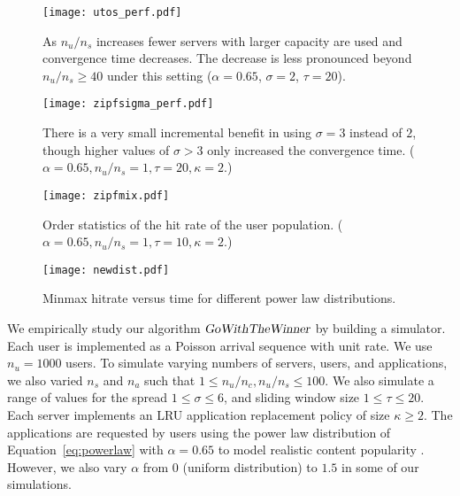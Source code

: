 \documentclass[conference]{IEEEtran}
\begin{document}
\begin{figure*}[t]
  \centering
\begin{minipage}[b]{0.45\textwidth}
\centering
\texttt{[image: utos\_perf.pdf]}
\caption{As $n_u/n_s$ increases  fewer servers with larger capacity are used and convergence time decreases. The decrease is less pronounced beyond  $n_u/n_s\geq 40$ under this setting ($\alpha=0.65$, $\sigma=2$, $\tau=20$).}
\label{fig:utos}
\end{minipage}
\qquad
\begin{minipage}[b]{0.45\textwidth}
\centering
\texttt{[image: zipfsigma\_perf.pdf]}
\caption{There is a very small incremental benefit in using $\sigma = 3$ instead of  $2$, though higher values of $\sigma > 3$ only increased the convergence time. ($\alpha=0.65, n_u/n_s = 1, \tau=20,\kappa=2.$)}
\label{fig:sigma}
\end{minipage}
\end{figure*}


\begin{figure*}[t]
  \centering
\begin{minipage}[b]{0.45\textwidth}
\centering
\texttt{[image: zipfmix.pdf]}
\caption{Order statistics of the hit rate of the user population. ($\alpha=0.65, n_u/n_s = 1, \tau=10,\kappa=2.$)}
\label{fig:mix}
\end{minipage}
\qquad
\begin{minipage}[b]{0.45\textwidth}
\centering
\texttt{[image: newdist.pdf]}
\caption{Minmax hitrate versus time for different power law distributions.}
\label{fig:dist}
\end{minipage}
\end{figure*}

We empirically study our algorithm $\textsl{GoWithTheWinner}$ by building a simulator. Each user is implemented as a Poisson arrival sequence with unit rate.  We use $n_u = 1000$ users. To simulate varying numbers of servers, users, and applications, we also varied $n_s$  and $n_a$  such that $1 \leq n_u/n_c, n_u/n_s \leq 100$. We also simulate a range of values for the spread $1 \leq \sigma \leq 6$, and sliding window size $1 \leq \tau \leq 20$. Each server implements an LRU application replacement policy of size $\kappa \geq 2$. The applications are requested by users using the power law distribution of Equation~\ref{eq:powerlaw} with $\alpha = 0.65$ to model realistic content popularity \cite{Breslau:1999} \cite{Gill:2007}. However, we also vary $\alpha$ from $0$ (uniform distribution) to $1.5$ in some of our simulations. 
\end{document}
